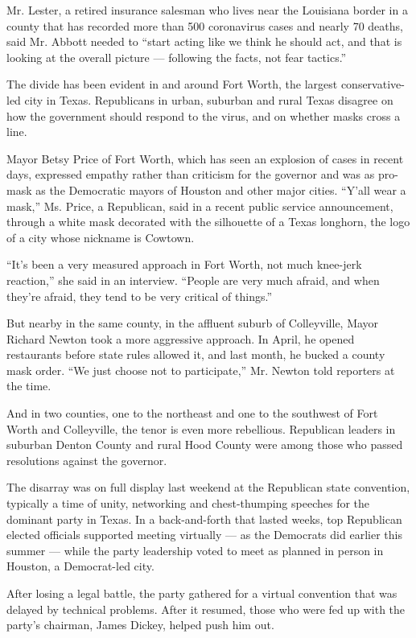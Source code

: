 Mr. Lester, a retired insurance salesman who lives near the Louisiana
border in a county that has recorded more than 500 coronavirus cases and
nearly 70 deaths, said Mr. Abbott needed to ``start acting like we think
he should act, and that is looking at the overall picture --- following
the facts, not fear tactics.''

The divide has been evident in and around Fort Worth, the largest
conservative-led city in Texas. Republicans in urban, suburban and rural
Texas disagree on how the government should respond to the virus, and on
whether masks cross a line.

Mayor Betsy Price of Fort Worth, which has seen an explosion of cases in
recent days, expressed empathy rather than criticism for the governor
and was as pro-mask as the Democratic mayors of Houston and other major
cities. ``Y'all wear a mask,'' Ms. Price, a Republican, said in a recent
public service announcement, through a white mask decorated with the
silhouette of a Texas longhorn, the logo of a city whose nickname is
Cowtown.

``It's been a very measured approach in Fort Worth, not much knee-jerk
reaction,'' she said in an interview. ``People are very much afraid, and
when they're afraid, they tend to be very critical of things.''

But nearby in the same county, in the affluent suburb of Colleyville,
Mayor Richard Newton took a more aggressive approach. In April, he
opened restaurants before state rules allowed it, and last month, he
bucked a county mask order. ``We just choose not to participate,'' Mr.
Newton told reporters at the time.

And in two counties, one to the northeast and one to the southwest of
Fort Worth and Colleyville, the tenor is even more rebellious.
Republican leaders in suburban Denton County and rural Hood County were
among those who passed resolutions against the governor.

The disarray was on full display last weekend at the Republican state
convention, typically a time of unity, networking and chest-thumping
speeches for the dominant party in Texas. In a back-and-forth that
lasted weeks, top Republican elected officials supported meeting
virtually --- as the Democrats did earlier this summer --- while the
party leadership voted to meet as planned in person in Houston, a
Democrat-led city.

After losing a legal battle, the party gathered for a virtual convention
that was delayed by technical problems. After it resumed, those who were
fed up with the party's chairman, James Dickey, helped push him out.

